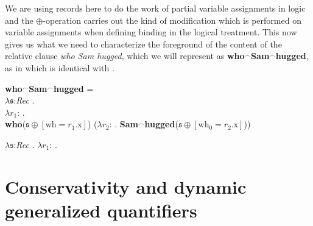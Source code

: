 We are using records here to do the work of partial variable
assignments in logic and the $\oplus$-operation carries out the kind
of modification which is performed on variable assignments when
defining binding in the logical treatment.  This now gives us what we
need to characterize the foreground of the content of the relative
clause \textit{who Sam hugged}, which we will represent as
\textbf{who}$^\frown$\textbf{Sam}$^\frown$\textbf{hugged}, as in
 which is identical with .
\begin{ex} 
\begin{subex} 
 
\item \textbf{who}$^\frown$\textbf{Sam}$^\frown$\textbf{hugged} = \\
  \hspace*{1em}$\lambda\mathfrak{s}$:\textit{Rec} . \\
\hspace*{2em}$\lambda
  r_1$:
  . \\
\hspace*{3em}\textbf{who}($\mathfrak{s}\oplus[\text{wh}=r_1.\text{x}]$)
($\lambda
  r_2$: . \textbf{Sam}$^\frown$\textbf{hugged}($\mathfrak{s}\oplus[\text{wh}_0=r_2.\text{x}]$)) 
 
\item $\lambda\mathfrak{s}$:\textit{Rec} . $\lambda
  r_1$:
  .  
 
\end{subex} 
   
\end{ex} 
     
   
    
    



\section{Conservativity and dynamic generalized quantifiers}

